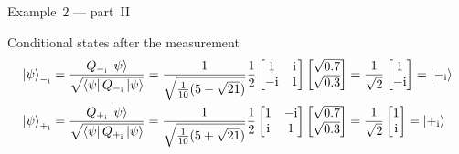         \begin{frame}{Example~$2$ --- part~II}
            \begin{block}{Conditional states after the measurement}
                \begin{equation*}
                    \begin{split}
                        \ket{\psi}_{-_\mathrm{i}} &= 
                        \frac{Q_{-_\mathrm{i}}\ket{\psi}}{\sqrt{\bra{\psi}Q_{-_\mathrm{i}}\ket{\psi}}}
                        = \frac{1}{\sqrt{\frac{1}{10} (5-\sqrt{21})}}
                        \frac{1}{2}
                        \begin{bmatrix}
                            1 & \mathrm{i}\\
                            -\mathrm{i} & 1
                        \end{bmatrix}
                        \begin{bmatrix}
                            \sqrt{0.7} \\
                            \sqrt{0.3}
                        \end{bmatrix}
                        = \frac{1}{\sqrt{2}}
                        \begin{bmatrix}
                            1 \\
                            - \mathrm{i}
                        \end{bmatrix}
                        = \ket{-_{\mathrm{i}}}\\
                        \ket{\psi}_{+_\mathrm{i}} &= 
                        \frac{Q_{+_\mathrm{i}}\ket{\psi}}{\sqrt{\bra{\psi}Q_{+_\mathrm{i}}\ket{\psi}}}
                        = \frac{1}{\sqrt{\frac{1}{10} (5+\sqrt{21})}}
                        \frac{1}{2}
                        \begin{bmatrix}
                            1 & - \mathrm{i}\\
                            \mathrm{i} & 1
                        \end{bmatrix}
                        \begin{bmatrix}
                            \sqrt{0.7} \\
                            \sqrt{0.3}
                        \end{bmatrix}
                        = \frac{1}{\sqrt{2}}
                        \begin{bmatrix}
                            1 \\
                            \mathrm{i} 
                        \end{bmatrix}
                        =\ket{+_{\mathrm{i}}}
                    \end{split}
                \end{equation*}
            \end{block}
        \end{frame}
